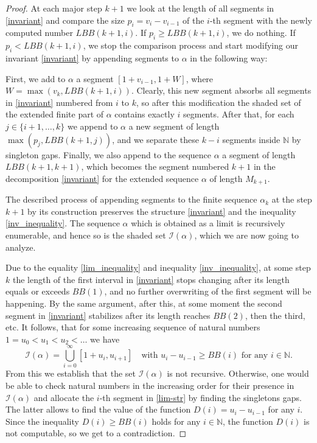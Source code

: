 \documentclass[12pt,a4paper]{amsart}
\begin{document}
\begin{proof}
At each major step $k+1$ we look at the length of all segments in \eqref{invariant} and compare the size $p_i=v_i-v_{i-1}$ of the $i$-th segment with the newly computed number $LBB(k+1,i)$. If $p_i\geq LBB(k+1,i)$, we do nothing. If $p_i<LBB(k+1,i)$, we stop the comparison process and start modifying our invariant \eqref{invariant} by appending segments to $\alpha$ in the following way:

First, we add to $\alpha$ a segment $[1+v_{i-1},1+W]$, where $W=\max(v_k,LBB(k+1,i))$. Clearly, this new segment absorbs all segments in \eqref{invariant} numbered from $i$ to $k$, so after this modification the shaded set of the extended finite part of $\alpha$ contains exactly $i$ segments. After that, for each $j\in \{i+1,\ldots, k\}$ we append to $\alpha$ a new segment of length $\max(p_{j},LBB(k+1,j))$, and we separate these $k-i$ segments inside $\mathbb N$ by singleton gaps. Finally, we also append to the sequence $\alpha$ a segment of length $LBB(k+1,k+1)$, which becomes the segment numbered $k+1$ in the decomposition \eqref{invariant} for the extended sequence $\alpha$ of length $M_{k+1}$.

\smallskip

The described process of appending segments to the finite sequence $\alpha_k$ at the step $k+1$ by its construction preserves the structure \eqref{invariant} and the inequality \eqref{inv_inequality}. The sequence $\alpha$ which is obtained as a limit is recursively enumerable, and hence so is the shaded set $\mathcal{I}(\alpha)$, which we are now going to analyze.

Due to the equality \eqref{lim_inequality} and inequality \eqref{inv_inequality}, at some step $k$ the length of the first interval in \eqref{invariant} stops changing after its length equals or exceeds $BB(1)$, and no further overwriting of the first segment will be happening. By the same argument, after this, at some moment the second segment in \eqref{invariant} stabilizes after its length reaches $BB(2)$, then the third, etc. It follows, that for some increasing sequence of natural numbers $1=u_0<u_1<u_2<\ldots$ we have
\begin{equation}
\label{lim-str}
\mathcal I(\alpha)=\bigcup_{i=0}^{\infty}[1+u_i,u_{i+1}] \quad \text{with } u_i-u_{i-1}\geq BB(i) \text{ for any } i\in \mathbb N.
\end{equation}
From this we establish that the set $\mathcal{I}(\alpha)$ is not recursive. Otherwise, one would be able to check natural numbers in the increasing order for their presence in $\mathcal{I}(\alpha)$ and allocate the $i$-th segment in \eqref{lim-str} by finding the singletons gaps. The latter allows to find the value of the function $D(i)=u_{i}-u_{i-1}$ for any $i$. Since the inequality $D(i)\geq BB(i)$ holds for any $i\in \mathbb N$, the function $D(i)$ is not computable, so we get to a contradiction.
\end{proof}
\end{document}
